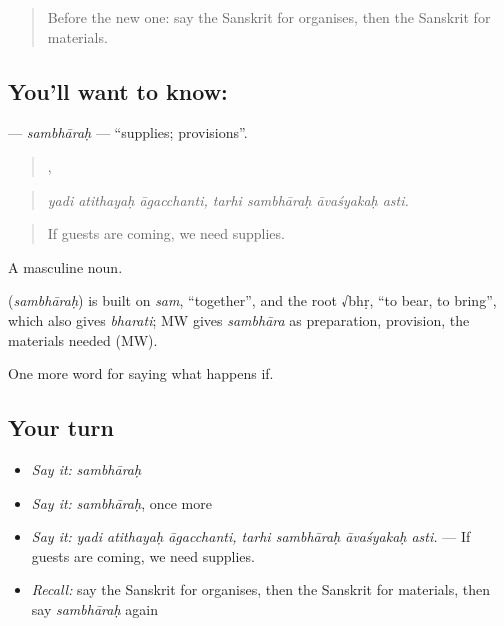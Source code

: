 \label{lesson:SA-C528-sambharah}



\begin{quote}
Before the new one: say the Sanskrit for organises, then the Sanskrit for materials.
\end{quote}

\subsection*{You'll want to know: }
\textbf{} — \emph{sambhāraḥ} — \textquotedblleft{}supplies; provisions\textquotedblright{}.

\begin{quote}
  ,    
\end{quote}

\begin{quote}
\emph{yadi atithayaḥ āgacchanti, tarhi sambhāraḥ āvaśyakaḥ asti.}
\end{quote}

\begin{quote}
If guests are coming, we need supplies.
\end{quote}

A masculine noun.

\begin{cousinweb}
\textbf{} (\emph{sambhāraḥ}) is built on \emph{sam}, \textquotedblleft{}together\textquotedblright{}, and the root √bhṛ, \textquotedblleft{}to bear, to bring\textquotedblright{}, which also gives \emph{bharati}; MW gives \emph{sambhāra} as preparation, provision, the materials needed (MW).
\end{cousinweb}

\begin{grammarlens}[title={What you've built}]
One more word for saying what happens if.
\end{grammarlens}

\subsection*{Your turn}
\begin{itemize}
\raggedright
  \item \emph{Say it:} \emph{sambhāraḥ}
  \item \emph{Say it:} \emph{sambhāraḥ}, once more
  \item \emph{Say it:} \emph{yadi atithayaḥ āgacchanti, tarhi sambhāraḥ āvaśyakaḥ asti.} — If guests are coming, we need supplies.
  \item \emph{Recall:} say the Sanskrit for organises, then the Sanskrit for materials, then say \emph{sambhāraḥ} again
\end{itemize}

